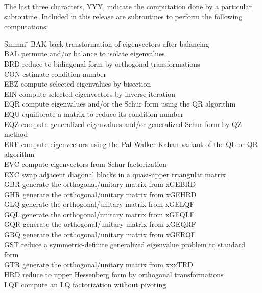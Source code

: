The last three characters, YYY, indicate the computation done by a
particular subroutine. 
Included in this release are subroutines
to perform the following computations:
\begin{tabbing}
Smmm \= \kill
BAK \>  back transformation of eigenvectors after balancing \\
BAL \>  permute and/or balance to isolate eigenvalues \\
BRD \>  reduce to bidiagonal form by orthogonal transformations \\
CON \>  estimate condition number\\
EBZ \>  compute selected eigenvalues by bisection \\
EIN \>  compute selected eigenvectors by inverse iteration \\
EQR \>  compute eigenvalues and/or the Schur form using the QR algorithm \\
EQU \>  equilibrate a matrix to reduce its condition number \\
EQZ \>  compute generalized eigenvalues and/or generalized Schur form by QZ method \\
ERF \>  compute eigenvectors using the Pal-Walker-Kahan variant of the QL or QR \\
    \>  algorithm \\
EVC \>  compute eigenvectors from Schur factorization \\
EXC \>  swap adjacent diagonal blocks in a quasi-upper triangular matrix \\
GBR \>  generate the orthogonal/unitary matrix from xGEBRD \\
GHR \>  generate the orthogonal/unitary matrix from xGEHRD \\
GLQ \>  generate the orthogonal/unitary matrix from xGELQF \\
GQL \>  generate the orthogonal/unitary matrix from xGEQLF \\
GQR \>  generate the orthogonal/unitary matrix from xGEQRF \\
GRQ \>  generate the orthogonal/unitary matrix from xGERQF \\
GST \>  reduce a symmetric-definite generalized eigenvalue problem to standard form \\
GTR \>  generate the orthogonal/unitary matrix from xxxTRD \\
HRD \>  reduce to upper Hessenberg form by orthogonal transformations \\
LQF \>  compute an LQ factorization without pivoting \\

\end{tabbing}

